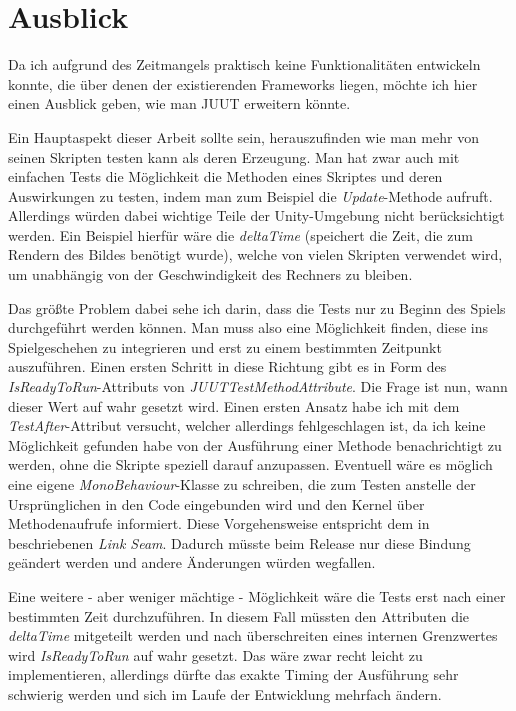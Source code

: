 \chapter{Ausblick}

Da ich aufgrund des Zeitmangels praktisch keine Funktionalitäten entwickeln konnte, die über denen der existierenden Frameworks liegen, möchte ich hier einen Ausblick geben, wie man JUUT erweitern könnte.

Ein Hauptaspekt dieser Arbeit sollte sein, herauszufinden wie man mehr von seinen Skripten testen kann als deren Erzeugung. Man hat zwar auch mit einfachen Tests die Möglichkeit die Methoden eines Skriptes und deren Auswirkungen zu testen, indem man zum Beispiel die \textit{Update}-Methode aufruft. Allerdings würden dabei wichtige Teile der Unity-Umgebung nicht berücksichtigt werden. Ein Beispiel hierfür wäre die \textit{deltaTime} (speichert die Zeit, die zum Rendern des Bildes benötigt wurde), welche von vielen Skripten verwendet wird, um unabhängig von der Geschwindigkeit des Rechners zu bleiben.

Das größte Problem dabei sehe ich darin, dass die Tests nur zu Beginn des Spiels durchgeführt werden können. Man muss also eine Möglichkeit finden, diese ins Spielgeschehen zu integrieren und erst zu einem bestimmten Zeitpunkt auszuführen. Einen ersten Schritt in diese Richtung gibt es in Form des \textit{IsReadyToRun}-Attributs von \textit{JUUTTestMethodAttribute}. Die Frage ist nun, wann dieser Wert auf wahr gesetzt wird. Einen ersten Ansatz habe ich mit dem \textit{TestAfter}-Attribut versucht, welcher allerdings fehlgeschlagen ist, da ich keine Möglichkeit gefunden habe von der Ausführung einer Methode benachrichtigt zu werden, ohne die Skripte speziell darauf anzupassen. Eventuell wäre es möglich eine eigene \textit{MonoBehaviour}-Klasse zu schreiben, die zum Testen anstelle der Ursprünglichen in den Code eingebunden wird und den Kernel über Methodenaufrufe informiert. Diese Vorgehensweise entspricht dem in \cite{FEA04} beschriebenen \textit{Link Seam}. Dadurch müsste beim Release nur diese Bindung geändert werden und andere Änderungen würden wegfallen.

Eine weitere - aber weniger mächtige - Möglichkeit wäre die Tests erst nach einer bestimmten Zeit durchzuführen. In diesem Fall müssten den Attributen die \textit{deltaTime} mitgeteilt werden und nach überschreiten eines internen Grenzwertes wird \textit{IsReadyToRun} auf wahr gesetzt. Das wäre zwar recht leicht zu implementieren, allerdings dürfte das exakte Timing der Ausführung sehr schwierig werden und sich im Laufe der Entwicklung mehrfach ändern.

